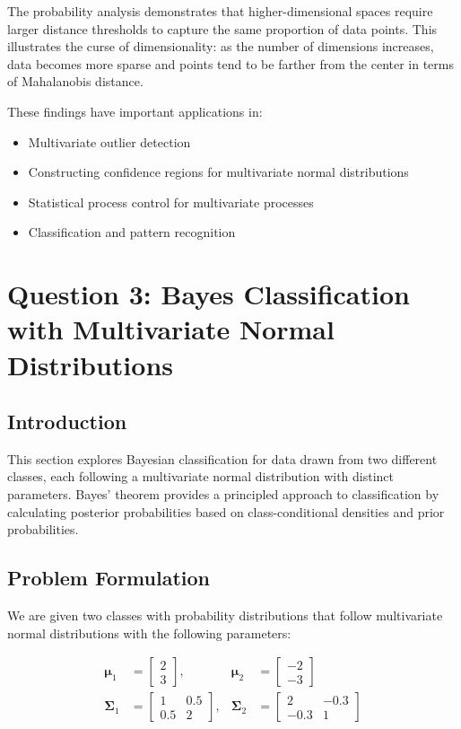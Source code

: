 \documentclass[12pt]{article}
\begin{document}
The probability analysis demonstrates that higher-dimensional spaces require larger distance thresholds to capture the same proportion of data points. This illustrates the curse of dimensionality: as the number of dimensions increases, data becomes more sparse and points tend to be farther from the center in terms of Mahalanobis distance.

These findings have important applications in:
\begin{itemize}
    \item Multivariate outlier detection
    \item Constructing confidence regions for multivariate normal distributions
    \item Statistical process control for multivariate processes
    \item Classification and pattern recognition
\end{itemize}

\section{Question 3: Bayes Classification with Multivariate Normal Distributions}

\subsection{Introduction}
This section explores Bayesian classification for data drawn from two different classes, each following a multivariate normal distribution with distinct parameters. Bayes' theorem provides a principled approach to classification by calculating posterior probabilities based on class-conditional densities and prior probabilities.

\subsection{Problem Formulation}
We are given two classes with probability distributions that follow multivariate normal distributions with the following parameters:

\begin{align*}
\boldsymbol{\mu}_1 &= \begin{bmatrix} 2 \\ 3 \end{bmatrix}, &
\boldsymbol{\mu}_2 &= \begin{bmatrix} -2 \\ -3 \end{bmatrix} \\
\boldsymbol{\Sigma}_1 &= \begin{bmatrix} 1 & 0.5 \\ 0.5 & 2 \end{bmatrix}, &
\boldsymbol{\Sigma}_2 &= \begin{bmatrix} 2 & -0.3 \\ -0.3 & 1 \end{bmatrix}
\end{align*}
\end{document}
